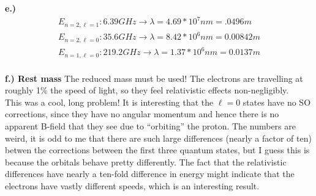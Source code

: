 \documentclass[10pt]{article} %
\begin{document}
\textbf{e.) }
\begin{align*}
  E_{n=2,\ell=1}: 6.39 GHz \rightarrow \lambda = 4.69*10^7 nm = .0496m\\
  E_{n=2,\ell=0}: 35.6 GHz \rightarrow \lambda = 8.42*10^6 nm = 0.00842m\\
  E_{n=1,\ell=0}: 219.2 GHz \rightarrow \lambda = 1.37*10^6 nm = 0.0137m\\
\end{align*}

\textbf{f.) Rest mass}
The reduced mass must be used! The electrons are travelling at roughly 1\% the speed
of light, so they feel relativistic effects non-negligibly.\\

This was a cool, long problem! It is interesting that the $\ell=0$ states have no
SO corrections, since they have no angular momentum and hence there is no apparent
B-field that they see due to ``orbiting'' the proton. The numbers are weird, it is odd
to me that there are such large differences (nearly a factor of ten) betwen the
corrections between the first three quantum states, but I guess this is because
the orbitals behave pretty differently. The fact that the relativistic differences
have nearly a ten-fold difference in energy might indicate that the electrons have
vastly different speeds, which is an interesting result.\\
\end{document}
